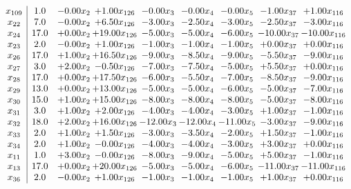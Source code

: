 \documentclass[8pt]{article}
\begin{document}
\[\begin{array}{c| c c@{\hskip 2pt} c@{\hskip 2pt} c@{\hskip 2pt} c@{\hskip 2pt} c@{\hskip 2pt} c@{\hskip 2pt} c@{\hskip 2pt} }
 x_{109}   &  1.0 & -0.00 x_{2} & +  1.00 x_{126} & -0.00 x_{3} & -0.00 x_{4} & -0.00 x_{5} & -1.00 x_{37} & +  1.00 x_{116}\\
 x_{22}   &  7.0 & -0.00 x_{2} & +  6.50 x_{126} & -3.00 x_{3} & -2.50 x_{4} & -3.00 x_{5} & -2.50 x_{37} & -3.00 x_{116}\\
 x_{24}   &  17.0 & +  0.00 x_{2} & + 19.00 x_{126} & -5.00 x_{3} & -5.00 x_{4} & -6.00 x_{5} & -10.00 x_{37} & -10.00 x_{116}\\
 x_{23}   &  2.0 & -0.00 x_{2} & +  1.00 x_{126} & -1.00 x_{3} & -1.00 x_{4} & -1.00 x_{5} & +  0.00 x_{37} & +  0.00 x_{116}\\
 x_{26}   &  17.0 & +  1.00 x_{2} & + 16.50 x_{126} & -9.00 x_{3} & -8.50 x_{4} & -9.00 x_{5} & -5.50 x_{37} & -9.00 x_{116}\\
 x_{27}   &  3.0 & +  2.00 x_{2} & -0.50 x_{126} & -7.00 x_{3} & -7.50 x_{4} & -5.00 x_{5} & +  5.50 x_{37} & +  0.00 x_{116}\\
 x_{28}   &  17.0 & +  0.00 x_{2} & + 17.50 x_{126} & -6.00 x_{3} & -5.50 x_{4} & -7.00 x_{5} & -8.50 x_{37} & -9.00 x_{116}\\
 x_{29}   &  13.0 & +  0.00 x_{2} & + 13.00 x_{126} & -5.00 x_{3} & -5.00 x_{4} & -6.00 x_{5} & -5.00 x_{37} & -7.00 x_{116}\\
 x_{30}   &  15.0 & +  1.00 x_{2} & + 15.00 x_{126} & -8.00 x_{3} & -8.00 x_{4} & -8.00 x_{5} & -5.00 x_{37} & -8.00 x_{116}\\
 x_{31}   &  3.0 & +  1.00 x_{2} & +  2.00 x_{126} & -4.00 x_{3} & -4.00 x_{4} & -3.00 x_{5} & +  1.00 x_{37} & -1.00 x_{116}\\
 x_{32}   &  18.0 & +  2.00 x_{2} & + 16.00 x_{126} & -12.00 x_{3} & -12.00 x_{4} & -11.00 x_{5} & -3.00 x_{37} & -9.00 x_{116}\\
 x_{33}   &  2.0 & +  1.00 x_{2} & +  1.50 x_{126} & -3.00 x_{3} & -3.50 x_{4} & -2.00 x_{5} & +  1.50 x_{37} & -1.00 x_{116}\\
 x_{34}   &  2.0 & +  1.00 x_{2} & -0.00 x_{126} & -4.00 x_{3} & -4.00 x_{4} & -3.00 x_{5} & +  3.00 x_{37} & +  0.00 x_{116}\\
 x_{11}   &  1.0 & +  3.00 x_{2} & -0.00 x_{126} & -8.00 x_{3} & -9.00 x_{4} & -5.00 x_{5} & +  5.00 x_{37} & -1.00 x_{116}\\
 x_{13}   &  17.0 & +  0.00 x_{2} & + 20.00 x_{126} & -5.00 x_{3} & -5.00 x_{4} & -6.00 x_{5} & -11.00 x_{37} & -11.00 x_{116}\\
 x_{36}   &  2.0 & -0.00 x_{2} & +  1.00 x_{126} & -1.00 x_{3} & -1.00 x_{4} & -1.00 x_{5} & +  1.00 x_{37} & +  0.00 x_{116}\\

\end{array}\]
\end{document}
